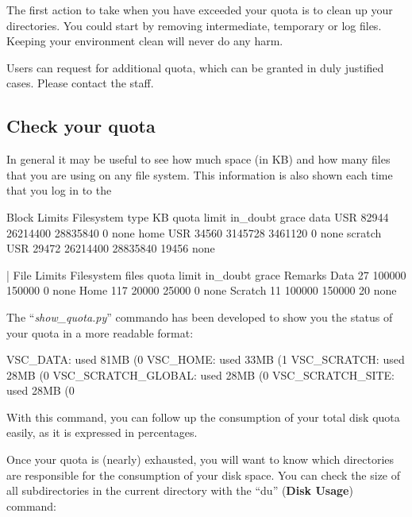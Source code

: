  The first action to take when you have exceeded your quota is
to clean up your directories. You could start by removing intermediate,
temporary or log files.  Keeping your environment clean will never do any harm.

 Users can request for additional quota, which can be granted in
duly justified cases. Please contact the \hpc staff.

\subsection{Check your quota}

In general it may be useful to see how much space (in KB) and how many files
that you are using on any file system.  This information is also shown each
time that you log in to the \hpc

\begin{prompt}
                         Block Limits                                    
Filesystem   type     KB     quota     limit  in_doubt  grace
data          USR  82944  26214400  28835840         0   none
home          USR  34560   3145728   3461120         0   none
scratch       USR  29472  26214400  28835840     19456   none

|      File Limits
Filesystem  files   quota   limit in_doubt  grace  Remarks
Data           27  100000  150000        0   none
Home          117   20000   25000        0   none
Scratch        11  100000  150000       20   none
\end{prompt}

The ``\emph{show\_quota.py}'' commando has been developed to show you the
status of your quota in a more readable format:

\begin{prompt}
VSC_DATA:    used 81MB (0%
VSC_HOME:    used 33MB (1%
VSC_SCRATCH:   used 28MB (0%
VSC_SCRATCH_GLOBAL: used 28MB (0%
VSC_SCRATCH_SITE:   used 28MB (0%
\end{prompt}

With this command, you can follow up the consumption of your total disk quota
easily, as it is expressed in percentages.

Once your quota is (nearly) exhausted, you will want to know which directories
are responsible for the consumption of your disk space. You can check the size
of all subdirectories in the current directory with the ``du'' (\textbf{Disk
Usage}) command:

